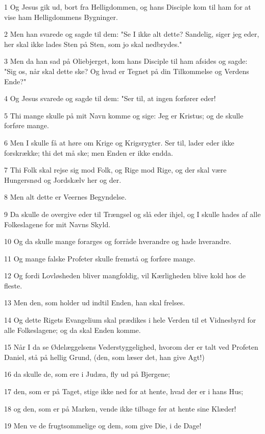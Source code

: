 \par 1 Og Jesus gik ud, bort fra Helligdommen, og hans Disciple kom til ham for at vise ham Helligdommens Bygninger.
\par 2 Men han svarede og sagde til dem: "Se I ikke alt dette? Sandelig, siger jeg eder, her skal ikke lades Sten på Sten, som jo skal nedbrydes."
\par 3 Men da han sad på Oliebjerget, kom hans Disciple til ham afsides og sagde: "Sig os, når skal dette ske? Og hvad er Tegnet på din Tilkommelse og Verdens Ende?"
\par 4 Og Jesus svarede og sagde til dem: "Ser til, at ingen forfører eder!
\par 5 Thi mange skulle på mit Navn komme og sige: Jeg er Kristus; og de skulle forføre mange.
\par 6 Men I skulle få at høre om Krige og Krigsrygter. Ser til, lader eder ikke forskrække; thi det må ske; men Enden er ikke endda.
\par 7 Thi Folk skal rejse sig mod Folk, og Rige mod Rige, og der skal være Hungersnød og Jordskælv her og der.
\par 8 Men alt dette er Veernes Begyndelse.
\par 9 Da skulle de overgive eder til Trængsel og slå eder ihjel, og I skulle hades af alle Folkeslagene for mit Navns Skyld.
\par 10 Og da skulle mange forarges og forråde hverandre og hade hverandre.
\par 11 Og mange falske Profeter skulle fremstå og forføre mange.
\par 12 Og fordi Lovløsheden bliver mangfoldig, vil Kærligheden blive kold hos de fleste.
\par 13 Men den, som holder ud indtil Enden, han skal frelses.
\par 14 Og dette Rigets Evangelium skal prædikes i hele Verden til et Vidnesbyrd for alle Folkeslagene; og da skal Enden komme.
\par 15 Når I da se Ødelæggelsens Vederstyggelighed, hvorom der er talt ved Profeten Daniel, stå på hellig Grund, (den, som læser det, han give Agt!)
\par 16 da skulle de, som ere i Judæa, fly ud på Bjergene;
\par 17 den, som er på Taget, stige ikke ned for at hente, hvad der er i hans Hus;
\par 18 og den, som er på Marken, vende ikke tilbage før at hente sine Klæder!
\par 19 Men ve de frugtsommelige og dem, som give Die, i de Dage!

